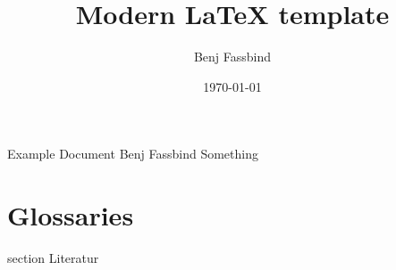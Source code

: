 \documentclass[oneside]{modern}
\title{Modern LaTeX template}
\author{Benj Fassbind}
\date{\today}
\begin{document}
  \nocite{*}

  \firstpage
    {Example Document}
    {Benj Fassbind}
    {Something}

  \addtableofcontents

  \newpage

  


  

  
  

  \chapter{Glossaries}

  \addglossary

  \newpage
    {section}
    {Literatur}

  \printbibliography[
    heading=subbibliography
  ]

  \newpage
  \listoffigures
\end{document}
